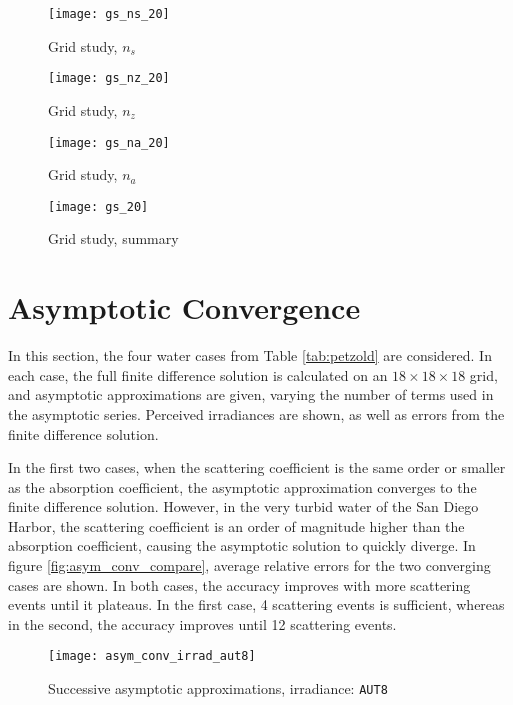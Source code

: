 \begin{figure}[H]
  \centering
  \texttt{[image: gs\_ns\_20]}
  \caption{Grid study, $n_s$}
  \label{fig:gs_ns}
\end{figure}

\begin{figure}[H]
  \centering
  \texttt{[image: gs\_nz\_20]}
  \caption{Grid study, $n_z$}
  \label{fig:gs_nz}
\end{figure}

\begin{figure}[H]
  \centering
  \texttt{[image: gs\_na\_20]}
  \caption{Grid study, $n_a$}
  \label{fig:gs_na}
\end{figure}

\begin{figure}[H]
  \centering
  \texttt{[image: gs\_20]}
  \caption{Grid study, summary}
  \label{fig:gs_compare}
\end{figure}


\section{Asymptotic Convergence}
\label{sec:asym_conv}

In this section, the four water cases from Table \ref{tab:petzold} are considered.
In each case, the full finite difference solution is calculated on an $18 \times 18 \times 18$ grid,
and asymptotic approximations are given, varying the number of terms used in the asymptotic series.
Perceived irradiances are shown, as well as errors from the finite difference solution.

In the first two cases, when the scattering coefficient is the same order or smaller as the absorption coefficient,
the asymptotic approximation converges to the finite difference solution.
However, in the very turbid water of the San Diego Harbor, the scattering coefficient is an order of magnitude higher
than the absorption coefficient, causing the asymptotic solution to quickly diverge.
In figure \ref{fig:asym_conv_compare}, average relative errors for the two converging cases are shown.
In both cases, the accuracy improves with more scattering events until it plateaus.
In the first case, 4 scattering events is sufficient, whereas in the second, the accuracy improves until 12 scattering events.

\begin{figure}[H]
  \centering
  \texttt{[image: asym\_conv\_irrad\_aut8]}
  \caption{Successive asymptotic approximations, irradiance: \texttt{AUT8}}
\end{figure}


